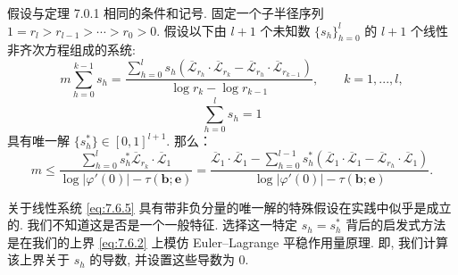 \begin{theorem}\label{thm:7.6.4}
假设与定理 7.0.1 相同的条件和记号. 
固定一个子半径序列 \(1 = r_l > r_{l-1} > \cdots > r_0 > 0\). 
假设以下由 \(l+1\) 个未知数 \(\{s_h\}_{h=0}^l\) 的 \(l+1\) 个线性非齐次方程组成的系统:
\begin{equation}\label{eq:7.6.5}
m\sum_{h=0}^{k-1} s_h = \frac{\sum_{h=0}^{l} s_h(\overline{\mathcal{L}}_{r_h} \cdot \overline{\mathcal{L}}_{r_k} - \overline{\mathcal{L}}_{r_h} \cdot \overline{\mathcal{L}}_{r_{k-1}})}{\log r_k - \log r_{k-1}}, \qquad k = 1, ..., l,
\end{equation}
\[ \sum_{h=0}^{l} s_h = 1 \]
具有唯一解 \(\{s_h^*\} \in [0,1]^{l+1}\). 
那么：
\begin{equation}\label{eq:7.6.6}
m \leq \frac{\sum_{h=0}^{l} s_{h}^{*} \overline{\mathcal{L}}_{r_{k}} \cdot \overline{\mathcal{L}}_{1}}{\log |\varphi'(0)| - \tau(\mathbf{b}; \mathbf{e})} = \frac{\overline{\mathcal{L}}_{1} \cdot \overline{\mathcal{L}}_{1} - \sum_{h=0}^{l-1} s_{h}^{*} (\overline{\mathcal{L}}_{1} \cdot \overline{\mathcal{L}}_{1} - \overline{\mathcal{L}}_{r_{h}} \cdot \overline{\mathcal{L}}_{1})}{\log |\varphi'(0)| - \tau(\mathbf{b}; \mathbf{e})}.
\end{equation}
\end{theorem}

\begin{remark}\label{rem:7.6.7}
关于线性系统 \eqref{eq:7.6.5} 具有带非负分量的唯一解的特殊假设在实践中似乎是成立的. 
我们不知道这是否是一个一般特征. 
选择这一特定 \(s_h = s_h^*\) 背后的启发式方法是在我们的上界 \eqref{eq:7.6.2} 上模仿 Euler--Lagrange 平稳作用量原理. 
即, 我们计算该上界关于 \(s_h\) 的导数, 
并设置这些导数为 0. \end{remark}

